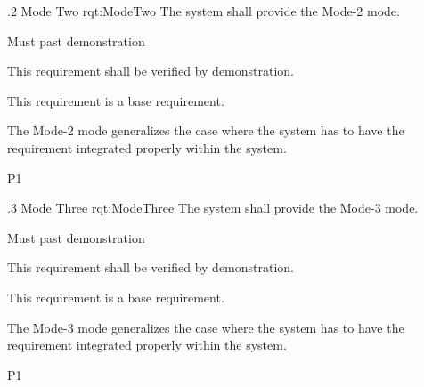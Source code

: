 \ONERQMTV
{\RqtNumberBase.2}
{Mode Two}
{rqt:ModeTwo}
{The system shall provide the Mode-2 mode.}
{
	\item [Phase 1] Must past demonstration
}
{This requirement shall be verified by demonstration.}
{
	\item [N/A] This requirement is a base requirement.
}
{
	\item The Mode-2 mode generalizes the case where the system has to have the requirement integrated properly within the system.
}
{P1}


\ONERQMTV
{\RqtNumberBase.3}
{Mode Three}
{rqt:ModeThree}
{The system shall provide the Mode-3 mode.}
{
	\item [Phase 1] Must past demonstration
}
{This requirement shall be verified by demonstration.}
{
	\item [N/A] This requirement is a base requirement.
}
{
	\item The Mode-3 mode generalizes the case where the system has to have the requirement integrated properly within the system.
}
{P1}

